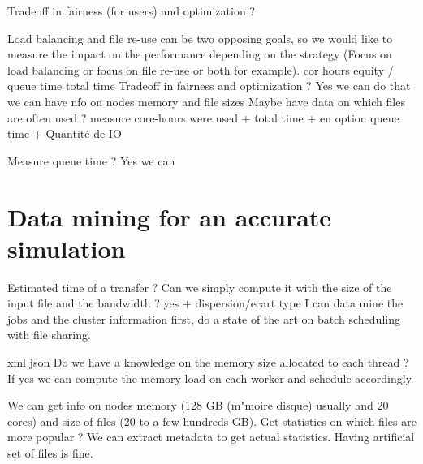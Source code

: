 \documentclass[a4paper]{article}
\begin{document}
Tradeoff in fairness (for users) and optimization ?

Load balancing and file re-use can be two opposing goals, so we would like to measure the impact on the performance depending on the strategy (Focus on load balancing or focus on file re-use or both for example).
cor hours
equity / queue time
total time
Tradeoff in fairness and optimization ? Yes we can do that
we can have nfo on nodes memory and file sizes
Maybe have data on which files are often used ?
measure core-hours were used + total time + en option queue time + Quantité de IO

Measure queue time ? Yes we can


\section{Data mining for an accurate simulation}
Estimated time of a transfer ? Can we simply compute it with the size of the input file and the bandwidth ? yes + dispersion/ecart type
I can data mine the jobs and the cluster information first, do a state of the art on batch scheduling with file sharing.

xml
json
Do we have a knowledge on the memory size allocated to each thread ? If yes we can compute the memory load on each worker and 
schedule accordingly.

We can get info on nodes memory (128 GB (m"moire disque) usually and 20 cores) and size of files (20 to a few hundreds GB).
Get statistics on which files are more popular ? We can extract metadata to get actual statistics. Having artificial set of files is fine.

\printbibliography
\end{document}
